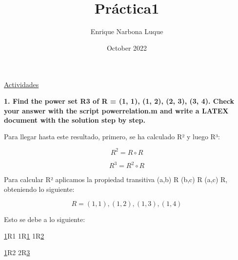 \documentclass{article}
\title{Práctica1}
\author{Enrique Narbona Luque}
\date{October 2022}
\begin{document}
\maketitle

\LARGE
\titl\underline{Actividades}

\vspace{5mm}

\RaggedRight
\normalsize

\textbf{1. Find the power set R3 of R = {(1, 1), (1, 2), (2, 3), (3, 4)}. Check your answer with the script powerrelation.m and write a LATEX document with the solution step by step.}

\vspace{5mm}

\normalsize
\RaggedRight

Para llegar hasta este resultado, primero, se ha calculado R² y luego R³:

\vspace{2mm}

\begin{equation}
    R^{2} = R \circ R 
\end{equation}

\vspace{1mm}

\begin{equation}
     R^{3} = R^{2} \circ R
\end{equation}

\vspace{2mm}

\RaggedRight
Para calcular R² aplicamos la propiedad transitiva (a,b) \in R \wedge (b,c) \in R \rightarrow (a,c) \in R, obteniendo lo siguiente:

\vspace{3mm}

\begin{equation}
    R = {(1,1),(1,2),(1,3),(1,4)}
\end{equation}

\vspace{2mm}

Esto se debe a lo siguiente:

\vspace{3mm}

\underline{1}R1 \rightarrow 1R\underline{1} 1R\underline{2}

\vspace{1mm}

\underline{1}R2 \rightarrow 2R\underline{3}

\vspace{1mm}
\end{document}

